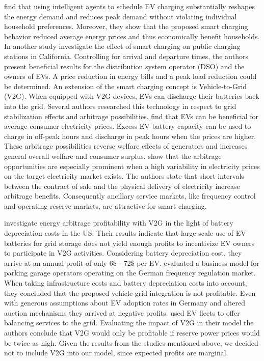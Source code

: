 \documentclass[12pt, article]{article}
\begin{document}
\textcite{valogianni14_effec_manag_elect_vehic_storag} find that using intelligent
agents to schedule EV charging substantially reshapes the energy demand and
reduces peak demand without violating individual household preferences. Moreover,
they show that the proposed smart charging behavior reduced average energy
prices and thus economically benefit households. In another study
\textcite{kara15_estim_benef_elect_vehic_smart} investigate the effect of smart
charging on public charging stations in California. Controlling for
arrival and departure times, the authors present beneficial results for the
distribution system operator (DSO) and the owners of EVs. A price
reduction in energy bills and a peak load reduction could be determined.
An extension of the smart charging concept is Vehicle-to-Grid (V2G). When
equipped with V2G devices, EVs can discharge their batteries back into the grid.
Several authors researched this technology in respect to grid stabilization
effects and arbitrage possibilities.
\textcite{schill11_elect_vehic_imper_elect_market} find that EVs can be beneficial
for average consumer electricity prices. Excess EV battery capacity can be used
to charge in off-peak hours and discharge in peak hours when the prices are
higher. These arbitrage possibilities reverse welfare effects of generators
and increases general overall welfare and consumer surplus.
\textcite{tomic07_using_fleet_elect_drive_vehic_grid_suppor} show that the
arbitrage opportunities are especially prominent when a high variability in
electricity prices on the target electricity market exists. The authors state
that short intervals between the contract of sale and the physical delivery of
electricity increase arbitrage benefits. Consequently ancillary service markets,
like frequency control and operating reserve markets, are attractive for smart
charging.

\textcite{peterson10_econom_using_plug_in_hybrid} investigate energy arbitrage
profitability with V2G in the light of battery depreciation costs in the US.
Their results indicate that large-scale use of EV batteries for grid storage
does not yield enough profits to incentivize EV owners to participate in V2G
activities. Considering battery depreciation cost, they arrive at an annual
profit of only 6\$ - 72\$ per EV.
\textcite{brandt17_evaluat_busin_model_vehic_grid_integ} evaluated a business
model for parking garage operators operating on the German frequency regulation
market. When taking infrastructure costs and battery depreciation costs into
account, they concluded that the proposed vehicle-grid integration is not
profitable. Even with generous assumptions about EV adoption rates in Germany
and altered auction mechanisms they arrived at negative profits.
\parencite{kahlen17_fleet} used EV fleets to offer balancing services to the grid.
Evaluating the impact of V2G in their model the authors conclude that V2G would
only be profitable if reserve power prices would be twice as high. Given the
results from the studies mentioned above, we decided not to include V2G into our
model, since expected profits are marginal.
\end{document}
